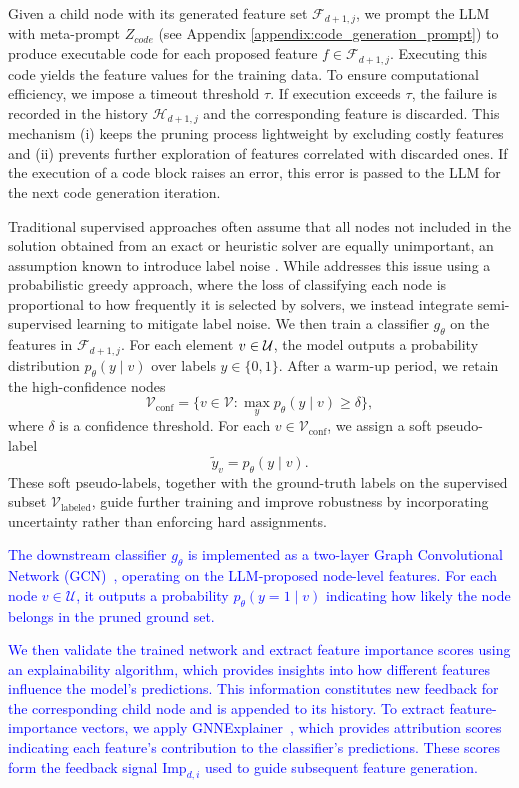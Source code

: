 Given a child node with its generated feature set $\mathcal{F}_{d+1,j}$, we prompt the LLM with meta-prompt $Z_{code}$ (see Appendix \ref{appendix:code_generation_prompt}) to produce executable code for each proposed feature $f \in \mathcal{F}_{d+1,j}$. Executing this code yields the feature values for the training data. To ensure computational efficiency, we impose a timeout threshold $\tau$. If execution exceeds $\tau$, the failure is recorded in the history $\mathcal{H}_{d+1,j}$ and the corresponding feature is discarded. This mechanism (i) keeps the pruning process lightweight by excluding costly features and (ii) prevents further exploration of features correlated with discarded ones. If the execution of a code block raises an error, this error is passed to the LLM for the next code generation iteration.


Traditional supervised approaches \citep{lauri2023learning,tian2024combhelper} often assume that all nodes not included in the solution obtained from an exact or heuristic solver are equally unimportant, an assumption known to introduce label noise \citep{manchanda2020gcomb}. While \citet{manchanda2020gcomb} addresses this issue using a probabilistic greedy approach, where the loss of classifying each node is proportional to how frequently it is selected by solvers, we instead integrate semi-supervised learning to mitigate label noise. We then train a classifier $g_\theta$ on the features in $\mathcal{F}_{d+1,j}$. For each element $v \in \mathcal{U}$, the model outputs a probability distribution $p_\theta(y \mid v)$ over labels $y \in \{0,1\}$. After a warm-up period, we retain the high-confidence nodes
\[
\mathcal{V}_{\text{conf}} = \{ v \in \mathcal{V} : \max_{y} p_\theta(y \mid v) \geq \delta \},
\]
where $\delta$ is a confidence threshold. For each $v \in \mathcal{V}_{\text{conf}}$, we assign a soft pseudo-label
\[
\tilde{y}_v = p_\theta(y \mid v).
\]
These soft pseudo-labels, together with the ground-truth labels on the supervised subset $\mathcal{V}_{\text{labeled}}$, guide further training and improve robustness by incorporating uncertainty rather than enforcing hard assignments.

\textcolor{blue}{The downstream classifier $g_\theta$ is implemented as a two-layer Graph Convolutional Network (GCN)~\citep{kipf2016semi}, operating on the LLM-proposed node-level features. For each node $v \in \mathcal{U}$, it outputs a probability $p_\theta(y=1 \mid v)$ indicating how likely the node belongs in the pruned ground set.}


\textcolor{blue}{We then validate the trained network and extract feature importance scores using an explainability algorithm, which provides insights into how different features influence the model’s predictions. This information constitutes new feedback for the corresponding child node and is appended to its history. \textcolor{blue}{To extract feature-importance vectors, we apply GNNExplainer~\citep{ying2019gnnexplainer}, which provides attribution scores indicating each feature’s contribution to the classifier’s predictions. These scores form the feedback signal $\text{Imp}_{d,i}$ used to guide subsequent feature generation.}}

